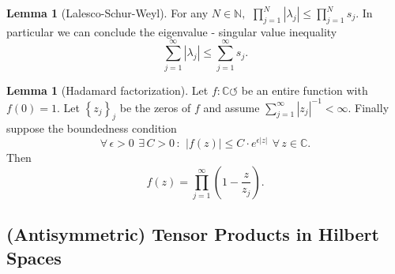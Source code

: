 \documentclass[a4paper, 10pt]{article}
\newcommand{\bbN}{\mathbb{N}}
\newcommand{\bbC}{\mathbb{C}}
\theoremstyle{definition}
\newtheorem{lemma}[definition]{Lemma}
\theoremstyle{remark}
\theoremstyle{remark}
\begin{document}
\begin{lemma}[Lalesco-Schur-Weyl]
    For any $N \in \bbN,\,\ \prod_{j=1}^N | \lambda_j | \leq \prod_{j=1}^N s_j$. 
    In particular we can conclude the eigenvalue - singular value inequality 
    \begin{equation}
        \sum_{j=1}^{\infty} | \lambda_j | \leq \sum_{j=1}^{\infty} s_j . 
    \end{equation}
\end{lemma}

\begin{lemma}[Hadamard factorization]
    \label{prod}
    Let $f : \bbC \circlearrowleft$ be an entire function with $f(0) = 1$. Let $\left\{ z_j \right\}_j$ be the zeros of $f$ and assume $\sum_{j=1}^{\infty} | z_j |^{-1} < \infty$. Finally suppose the boundedness condition
    \begin{equation}
        \forall\, \epsilon > 0\,\  \exists\, C > 0 \,:\,\ | f(z) | \leq C \cdot e^{\epsilon |z|}\,\ \forall\, z \in \bbC . 
    \end{equation}
    Then 
    \begin{equation}
        f(z) = \prod_{j=1}^{\infty} (1 - \frac{z}{z_j}) . 
    \end{equation}
\end{lemma}

\subsection{(Antisymmetric) Tensor Products in Hilbert Spaces}
\end{document}
